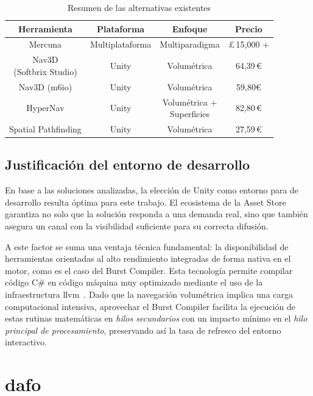 \begin{table}[htp]
  \centering
  \begin{tabular}{c|c|c|c}
  \rowcolor{udcpink!25}
  \textbf{Herramienta} & \textbf{Plataforma} & \textbf{Enfoque} & \textbf{Precio} \\\hline
  Mercuna & Multiplataforma & Multiparadigma & \pounds\,15,000 + \\
  \makecell{Nav3D \\ (Softbrix Studio)} & Unity & Volumétrica & 64,39\,\euro \\
  Nav3D (m6io) & Unity & Volumétrica & 59,80\euro \\
  HyperNav & Unity & \makecell{Volumétrica + \\ Superficies} & 82,80\,\euro \\
  Spatial Pathfinding & Unity & Volumétrica & 27,59\,\euro \\
  \end{tabular}
  \caption{Resumen de las alternativas existentes}
  \label{tab:alternativas}
\end{table}

\subsection{Justificación del entorno de desarrollo}
\label{sec:justificacionentorno}

En base a las soluciones analizadas, la elección de Unity como entorno para de desarrollo resulta óptima para este trabajo.
El ecosistema de la Asset Store garantiza no solo que la solución responda a una demanda real, sino que también asegura un canal con la visibilidad suficiente para su correcta difusión.

A este factor se suma una ventaja técnica fundamental: la disponibilidad de herramientas orientadas al alto rendimiento integradas de forma nativa en el motor, como es el caso del Burst Compiler.
Esta tecnología permite compilar código C\# en código máquina muy optimizado mediante el uso de la infraestructura \gls{llvm}~\cite{llvm2004}.
Dado que la navegación volumétrica implica una carga computacional intensiva, aprovechar el Burst Compiler facilita la ejecución de estas rutinas matemáticas en \textit{hilos secundarios} con un impacto mínimo en el \textit{hilo principal de procesamiento}, preservando así la tasa de refresco del entorno interactivo.

\section{\texorpdfstring{\acrshort{dafo}}{DAFO}}

